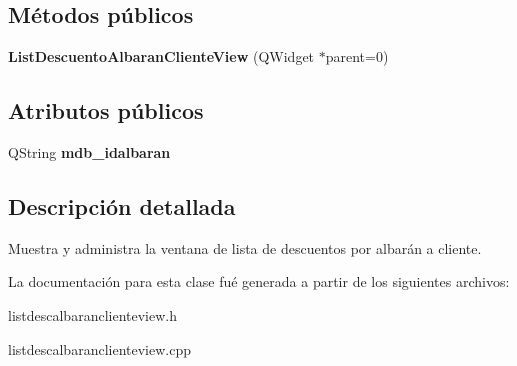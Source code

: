 \subsection*{M\'{e}todos p\'{u}blicos}
\begin{CompactItemize}
\item 
{\bf List\-Descuento\-Albaran\-Cliente\-View} (QWidget $\ast$parent=0)\label{classListDescuentoAlbaranClienteView_a0}

\end{CompactItemize}
\subsection*{Atributos p\'{u}blicos}
\begin{CompactItemize}
\item 
QString {\bf mdb\_\-idalbaran}\label{classListDescuentoAlbaranClienteView_o0}

\end{CompactItemize}


\subsection{Descripci\'{o}n detallada}
Muestra y administra la ventana de lista de descuentos por albar\'{a}n a cliente. 



La documentaci\'{o}n para esta clase fu\'{e} generada a partir de los siguientes archivos:\begin{CompactItemize}
\item 
listdescalbaranclienteview.h\item 
listdescalbaranclienteview.cpp\end{CompactItemize}
